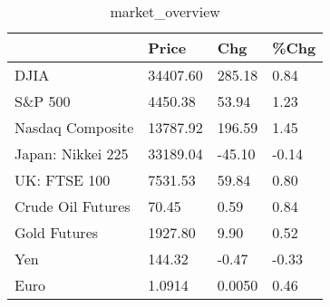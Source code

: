 \documentclass{article}%
\begin{document}
%


\begin{table}[htbp]%
\caption{market\_overview}%
\centering%
\begin{adjustbox}{width=1\textwidth}%
\begin{tabular}{llll}
\toprule
                  &    Price &    Chg &  \%Chg \\
\midrule
             DJIA & 34407.60 & 285.18 &  0.84 \\
          S\&P 500 &  4450.38 &  53.94 &  1.23 \\
 Nasdaq Composite & 13787.92 & 196.59 &  1.45 \\
Japan: Nikkei 225 & 33189.04 & -45.10 & -0.14 \\
     UK: FTSE 100 &  7531.53 &  59.84 &  0.80 \\
Crude Oil Futures &    70.45 &   0.59 &  0.84 \\
     Gold Futures &  1927.80 &   9.90 &  0.52 \\
              Yen &   144.32 &  -0.47 & -0.33 \\
             Euro &   1.0914 & 0.0050 &  0.46 \\
\bottomrule
\end{tabular}
%
\end{adjustbox}%
\end{table}

%
\end{document}
